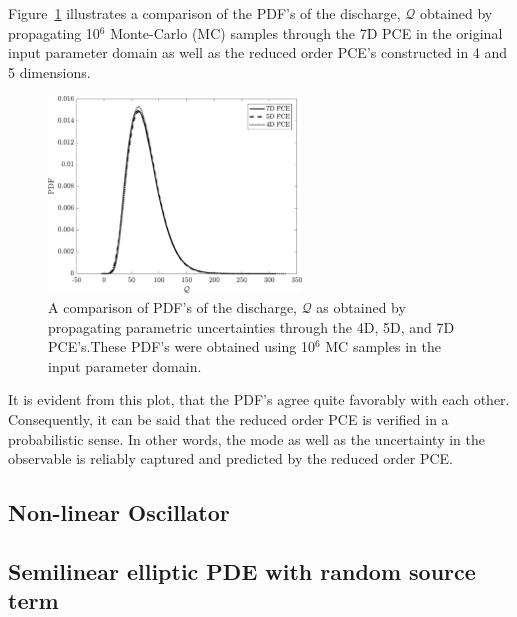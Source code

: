 Figure~\ref{fig:pdfcomp_bore} illustrates a comparison of the PDF's of the discharge, $\mathcal{Q}$
obtained by propagating 10$^6$ Monte-Carlo (MC) samples through the 7D PCE in the
original input parameter domain as well as the reduced order PCE's constructed in 4 and 5 dimensions. 

\begin{figure}[htbp]
 \begin{center}
  \includegraphics[width=0.6\textwidth]{./Figures/pdf_comp_borehole}
\caption{A comparison of PDF's of the discharge, $\mathcal{Q}$ as obtained
by propagating
parametric uncertainties through the 4D, 5D, and 7D PCE's.These PDF's 
were obtained using 10$^{6}$ MC samples in the input parameter domain.} 
\label{fig:pdfcomp_bore}
\end{center}
\end{figure}

\noindent It is evident from this plot, that the PDF's agree quite favorably with each other. Consequently, it can
be said that the reduced order PCE is verified in a probabilistic sense. In other words, the mode as
well as the uncertainty in the observable is reliably captured and predicted by the reduced order PCE. 
 
\subsection{Non-linear Oscillator}

\subsection{Semilinear elliptic PDE with random source term}

